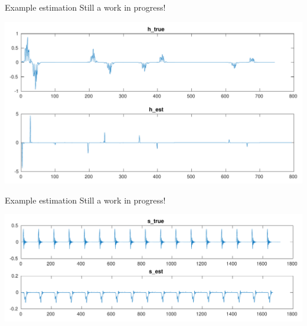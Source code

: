\documentclass[xcolor=dvipsnames,t]{beamer} %
\begin{document}


\begin{frame}{Example estimation}
   Still a work in progress!\\
   \begin{center}
      \includegraphics[width=\textwidth]{figures/bce_rec_03_h_trim.pdf}
   \end{center}
\end{frame}

\begin{frame}{Example estimation}
   Still a work in progress!\\
   \begin{center}
      \includegraphics[width=\textwidth]{figures/bce_rec_03_s_trim.pdf}
   \end{center}
\end{frame}
\end{document}
